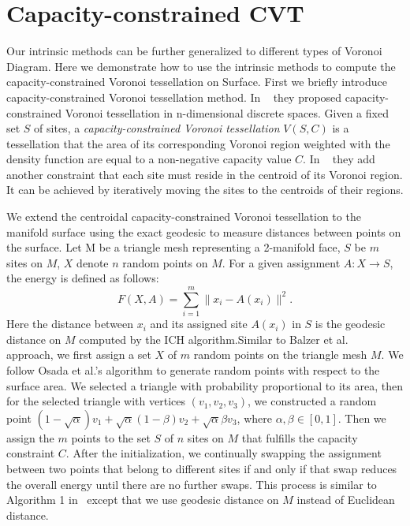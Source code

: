 \section{Capacity-constrained CVT}\label{sec:ccvt}
Our intrinsic methods can be further generalized to different types of Voronoi Diagram. Here we demonstrate how to use the intrinsic methods to compute the capacity-constrained Voronoi tessellation on Surface. First we briefly introduce capacity-constrained Voronoi tessellation method. In ~\cite{BalzerHeck:2008:CCVDIFS} they proposed capacity-constrained Voronoi tessellation in n-dimensional discrete spaces. Given a fixed set $S$ of sites, a \emph{capacity-constrained Voronoi tessellation} $V(S,C)$ is a tessellation that the area of its corresponding Voronoi region weighted with the density function are equal to a non-negative capacity value $C$. In ~\cite{Balzer.etal:2009:CCPDAVoLM} they add another constraint that each site must reside in the centroid of its Voronoi region. It can be achieved by iteratively moving the sites to the centroids of their regions.

We extend the centroidal capacity-constrained Voronoi tessellation to the manifold surface using the exact geodesic to measure distances between points on the surface. Let M be a triangle mesh representing a 2-manifold face, $S$ be $m$ sites on $M$, $X$ denote $n$ random points on $M$.
For a given assignment $A: X \rightarrow S$, the energy is defined as follows:
\begin{equation}
F(X,A)=\sum_{i=1}^{m}\|x_i-A(x_i)\|^2.\nonumber
\end{equation}
Here the distance between $x_i$ and its assigned site $A(x_i)$ in $S$ is the geodesic distance on $M$ computed by the ICH algorithm.Similar to Balzer et al.~\cite{Balzer.etal:2009:CCPDAVoLM} approach, we first assign a set $X$ of $m$ random points on the triangle mesh $M$. We follow Osada et al.'s algorithm to generate random points with respect to the surface area. We selected a triangle with probability proportional to its area, then for the selected triangle with vertices $(v_1,v_2,v_3)$, we constructed a random point $(1-\sqrt{\alpha})v_1+\sqrt{\alpha}(1-\beta)v_2+\sqrt{\alpha}\beta{v_3}$, where $\alpha,\beta{\in}[0,1]$.
Then we assign the $m$ points to the set $S$ of $n$ sites on $M$ that fulfills the capacity constraint $C$.
After the initialization, we continually swapping the assignment between two points that belong to different sites if and only if that swap reduces the overall energy until there are no further swaps. This process is similar to Algorithm 1 in~\cite{Balzer.etal:2009:CCPDAVoLM} except that we use geodesic distance on $M$ instead of Euclidean distance.

